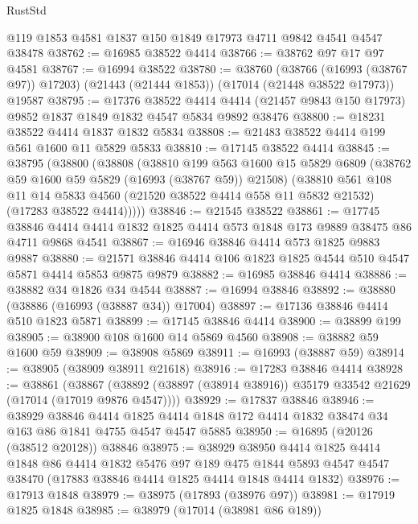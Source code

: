 \begin{lexlean}{RustStd}
\begin{coremodule}
    @119
    @1853
    @4581
    @1837
    @150
    @1849
    @17973
    @4711
    @9842
    @4541
    @4547
    @38478
@38762 := @16985 @38522 @4414
@38766 := @38762 @97 @17 @97 @4581
@38767 := @16994 @38522
@38780 := @38760
    (@38766 (@16993 (@38767 @97)) @17203)
    (@21443 (@21444 @1853))
    (@17014 (@21448 @38522 @17973))
    @19587
@38795 := @17376
    @38522
    @4414
    @4414
    (@21457 @9843 @150 @17973)
    @9852
    @1837
    @1849
    @1832
    @4547
    @5834
    @9892
    @38476
@38800 := @18231 @38522 @4414 @1837 @1832 @5834
@38808 := @21483 @38522 @4414 @199 @561 @1600 @11 @5829 @5833
@38810 := @17145 @38522 @4414
@38845 := @38795
    (@38800
      (@38808
        (@38810
          @199
          @563
          @1600
          @15
          @5829
          @6809
          (@38762 @59 @1600 @59 @5829 (@16993 (@38767 @59)) @21508)
          (@38810
            @561
            @108
            @11
            @14
            @5833
            @4560
            (@21520 @38522 @4414 @558 @11 @5832 @21532)
            (@17283 @38522 @4414)))))
@38846 := @21545 @38522
@38861 := @17745
    @38846
    @4414
    @4414
    @1832
    @1825
    @4414
    @573
    @1848
    @173
    @9889
    @38475
    @86
    @4711
    @9868
    @4541
@38867 := @16946 @38846 @4414 @573 @1825 @9883 @9887
@38880 := @21571 @38846 @4414 @106 @1823 @1825 @4544 @510 @4547 @5871 @4414 @5853 @9875 @9879
@38882 := @16985 @38846 @4414
@38886 := @38882 @34 @1826 @34 @4544
@38887 := @16994 @38846
@38892 := @38880 (@38886 (@16993 (@38887 @34)) @17004)
@38897 := @17136 @38846 @4414 @510 @1823 @5871
@38899 := @17145 @38846 @4414
@38900 := @38899 @199
@38905 := @38900 @108 @1600 @14 @5869 @4560
@38908 := @38882 @59 @1600 @59
@38909 := @38908 @5869
@38911 := @16993 (@38887 @59)
@38914 := @38905 (@38909 @38911 @21618)
@38916 := @17283 @38846 @4414
@38928 := @38861
    (@38867 (@38892 (@38897 (@38914 @38916)) @35179 @33542 @21629 (@17014 (@17019 @9876 @4547))))
@38929 := @17837 @38846
@38946 := @38929
    @38846
    @4414
    @1825
    @4414
    @1848
    @172
    @4414
    @1832
    @38474
    @34
    @163
    @86
    @1841
    @4755
    @4547
    @4547
    @5885
@38950 := @16895 (@20126 (@38512 @20128)) @38846
@38975 := @38929
    @38950
    @4414
    @1825
    @4414
    @1848
    @86
    @4414
    @1832
    @5476
    @97
    @189
    @475
    @1844
    @5893
    @4547
    @4547
    @38470
    (@17883 @38846 @4414 @1825 @4414 @1848 @4414 @1832)
@38976 := @17913 @1848
@38979 := @38975 (@17893 (@38976 @97))
@38981 := @17919 @1825 @1848
@38985 := @38979 (@17014 (@38981 @86 @189))

\end{coremodule}
\end{lexlean}
